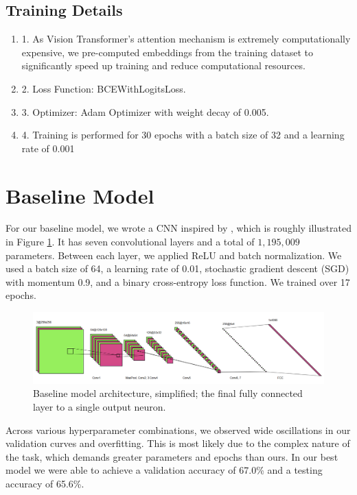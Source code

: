 \documentclass{article} %
\begin{document}
\subsection{Training Details}
\begin {enumerate}
\item[1.]As Vision Transformer's attention mechanism is extremely computationally expensive, we pre-computed embeddings from the training dataset to significantly speed up training and reduce computational resources.
\item[2.]Loss Function: BCEWithLogitsLoss.
\item[3.]Optimizer: Adam Optimizer with weight decay of 0.005.
\item[4.]Training is performed for 30 epochs with a batch size of 32 and a learning rate of 0.001
\end{enumerate}

\section{Baseline Model}

For our baseline model, we wrote a CNN inspired by \citet{wang2020cnngeneratedimagessurprisinglyeasy}, which is roughly illustrated in Figure \ref{fig:baseline_arch}. It has seven convolutional layers and a total of $1,195,009$ parameters. Between each layer, we applied ReLU and batch normalization. We used a batch size of 64, a learning rate of 0.01, stochastic gradient descent (SGD) with momentum 0.9, and a binary cross-entropy loss function. We trained over 17 epochs.

\begin{figure}[h]
    \begin{center}
        \includegraphics[scale=0.45]{figs/baseline.png}
    \end{center}
    \caption{Baseline model architecture, simplified; the final fully connected layer to a single output neuron.}
    \label{fig:baseline_arch}
\end{figure}

Across various hyperparameter combinations, we observed wide oscillations in our validation curves and overfitting. This is most likely due to the complex nature of the task, which demands greater parameters and epochs than ours. In our best model we were able to achieve a validation accuracy of 67.0\% and a testing accuracy of 65.6\%.
\end{document}
